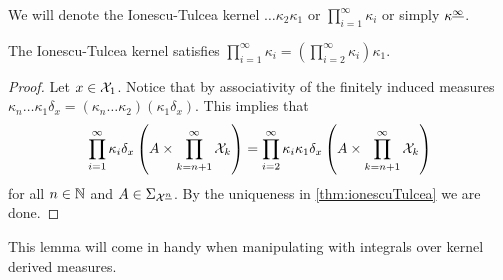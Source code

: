 We will denote the Ionescu-Tulcea kernel $\dots \kappa_2 \kappa_1$ or
$\prod_{i=1}^\infty \kappa_i$ or simply $\kappa^{\underline{\infty}}$.

\begin{lem}
  The Ionescu-Tulcea kernel satisfies
  $\prod_{i=1}^\infty \kappa_i = (\prod_{i=2}^\infty \kappa_i) \kappa_1 $.
  \label{lem:ionescu}
\end{lem}
\begin{proof}
  Let $x \in \mathcal{X}_1$.
  Notice that by associativity of the finitely induced measures
  $\kappa_n \dots \kappa_1 \delta_x
  = (\kappa_n \dots \kappa_2) (\kappa_1 \delta_x)$.
  This implies that
  \[ \prod_{i=1}^\infty \kappa_i \delta_x
    \left( A \times \prod_{k=n+1}^\infty \mathcal{X}_k \right)
    = \prod_{i=2}^\infty \kappa_i \kappa_1 \delta_x
  \left( A \times \prod_{k=n+1}^\infty \mathcal{X}_k \right) \]
  for all $n \in \mathbb{N}$ and $A \in \Sigma_{\mathcal{X}^{\underline{n}}}$.
  By the uniqueness in \cref{thm:ionescuTulcea} we are done.
\end{proof}
This lemma will come in handy when manipulating with integrals over
kernel derived measures.

